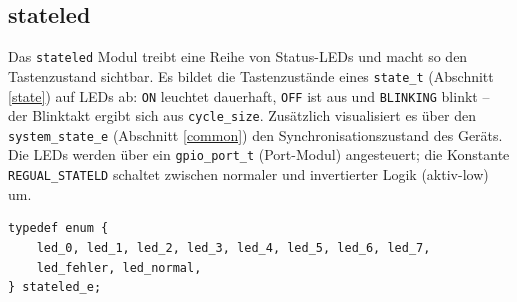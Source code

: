 \subsection{stateled}\label{stateled}
Das \verb|stateled| Modul treibt eine Reihe von Status-LEDs und macht so den
Tastenzustand sichtbar. Es bildet die Tastenzustände eines \verb|state_t|
(Abschnitt \ref{state}) auf LEDs ab: \verb|ON| leuchtet dauerhaft, \verb|OFF|
ist aus und \verb|BLINKING| blinkt -- der Blinktakt ergibt sich aus
\verb|cycle_size|. Zusätzlich visualisiert es über den \verb|system_state_e|
(Abschnitt \ref{common}) den Synchronisationszustand des Geräts. Die LEDs
werden über ein \verb|gpio_port_t| (Port-Modul) angesteuert; die Konstante
\verb|REGUAL_STATELD| schaltet zwischen normaler und invertierter Logik
(aktiv-low) um.

\begin{listing}
\begin{verbatim}
typedef enum {
    led_0, led_1, led_2, led_3, led_4, led_5, led_6, led_7,
    led_fehler, led_normal,
} stateled_e;
\end{verbatim}
\caption{LED-Bezeichner \texttt{stateled\_e}}
\label{stateled_e}
\end{listing}


